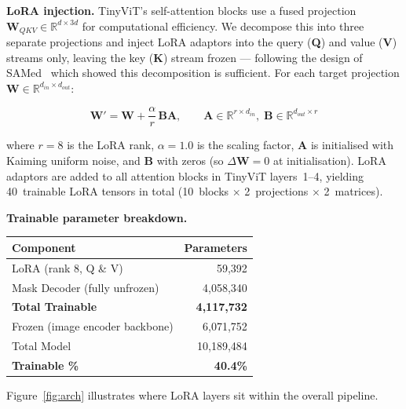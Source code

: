 \documentclass[10pt,twocolumn]{article}
\begin{document}
\textbf{LoRA injection.}
TinyViT's self-attention blocks use a fused projection
$\mathbf{W}_{QKV} \in \mathbb{R}^{d \times 3d}$ for computational
efficiency. We decompose this into three separate projections
and inject LoRA adaptors into the query (\textbf{Q}) and value
(\textbf{V}) streams only, leaving the key (\textbf{K})
stream frozen --- following the design of SAMed~\cite{zhang2023samed}
which showed this decomposition is sufficient. For each target
projection $\mathbf{W} \in \mathbb{R}^{d_{in} \times d_{out}}$:

\begin{equation}
  \mathbf{W}' = \mathbf{W} + \frac{\alpha}{r}\,\mathbf{B}\mathbf{A},
  \qquad
  \mathbf{A} \in \mathbb{R}^{r \times d_{in}},\;
  \mathbf{B} \in \mathbb{R}^{d_{out} \times r}
\end{equation}

where $r = 8$ is the LoRA rank, $\alpha = 1.0$ is the scaling
factor, $\mathbf{A}$ is initialised with Kaiming uniform noise,
and $\mathbf{B}$ with zeros (so $\Delta\mathbf{W}=0$ at
initialisation). LoRA adaptors are added to all attention
blocks in TinyViT layers~1--4, yielding 40~trainable LoRA
tensors in total (10~blocks $\times$ 2~projections $\times$
2~matrices).

\textbf{Trainable parameter breakdown.}

\begin{center}
\small
\begin{tabular}{lr}
\toprule
\textbf{Component} & \textbf{Parameters} \\
\midrule
LoRA (rank 8, Q \& V)  & 59,392 \\
Mask Decoder (fully unfrozen) & 4,058,340 \\
\midrule
\textbf{Total Trainable} & \textbf{4,117,732} \\
Frozen (image encoder backbone) & 6,071,752 \\
\midrule
Total Model & 10,189,484 \\
\textbf{Trainable \%} & \textbf{40.4\%} \\
\bottomrule
\end{tabular}
\end{center}

Figure~\ref{fig:arch} illustrates where LoRA layers sit within
the overall pipeline.
\end{document}
